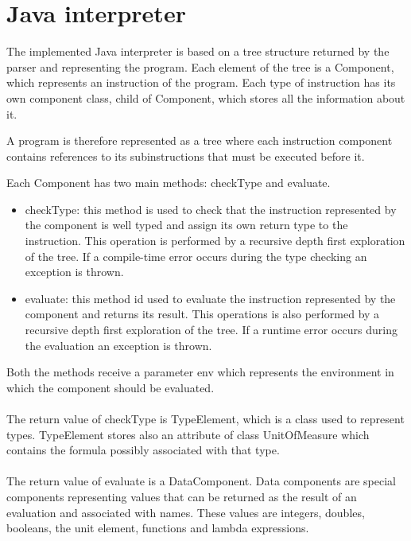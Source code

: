 \documentclass[]{article}
\begin{document}
	
	\section{Java interpreter}
	\label{sec:javaInterpreter}
		The implemented Java interpreter is based on a tree structure returned by the parser and representing the program. Each element of the tree is a Component, which represents an instruction of the program. Each type of instruction has its own component class, child of Component, which stores all the information about it. 
		
		A program is therefore represented as a tree where each instruction component contains references to its subinstructions that must be executed before it. 
		
		Each Component has two main methods: checkType and evaluate.
		\begin{itemize}
			\item checkType: this method is used to check that the instruction represented by the component is well typed and assign its own return type to the instruction. This operation is performed by a recursive depth first exploration of the tree. If a compile-time error occurs during the type checking an exception is thrown.
			\item evaluate: this method id used to evaluate the instruction represented by the component and returns its result. This operations is also performed by a recursive depth first exploration of the tree. If a runtime error occurs during the evaluation an exception is thrown.
		\end{itemize}
	
		Both the methods receive a parameter env which represents the environment in which the component should be evaluated.\\\\
		The return value of checkType is TypeElement, which is a class used to represent types. TypeElement stores also an attribute of class UnitOfMeasure which contains the formula possibly associated with that type.\\\\
		The return value of evaluate is a DataComponent. Data components are special components representing values that can be returned as the result of an evaluation and associated with names. These values are integers, doubles, booleans, the unit element, functions and lambda expressions.
	
\end{document}
